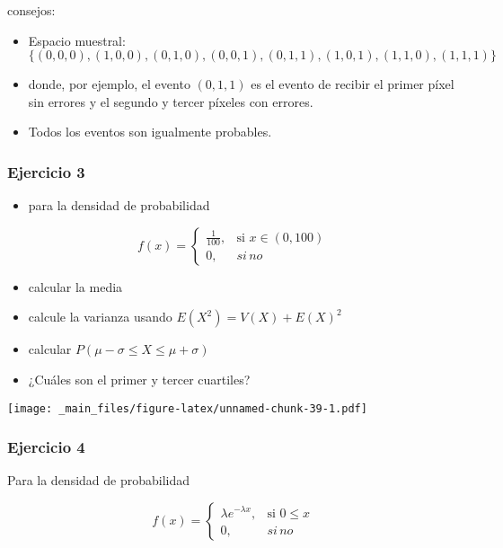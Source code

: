\documentclass[
]{book}
\providecommand{\tightlist}{%
  \setlength{\itemsep}{0pt}\setlength{\parskip}{0pt}}
\begin{document}
consejos:

\begin{itemize}
\item
  Espacio muestral: \(\{(0,0,0), (1,0,0), (0,1,0), (0,0,1), (0,1,1), (1, 0,1), (1,1,0), (1,1,1)\}\)
\item
  donde, por ejemplo, el evento \((0,1,1)\) es el evento de recibir el primer píxel sin errores y el segundo y tercer píxeles con errores.
\item
  Todos los eventos son igualmente probables.
\end{itemize}

\hypertarget{ejercicio-3-1}{%
\subsubsection{Ejercicio 3}\label{ejercicio-3-1}}

\begin{itemize}
\tightlist
\item
  para la densidad de probabilidad
\end{itemize}

\[
    f(x)= 
\begin{cases}
    \frac{1}{100},& \text{si } x\in (0,100)\\
    0,& si \, no 
\end{cases}
\]

\begin{itemize}
\tightlist
\item
  calcular la media
\item
  calcule la varianza usando \(E(X^2)=V(X)+E(X)^2\)
\item
  calcular \(P(\mu-\sigma\leq X \leq \mu+\sigma)\)
\item
  ¿Cuáles son el primer y tercer cuartiles?
\end{itemize}

\texttt{[image: \_main\_files/figure-latex/unnamed-chunk-39-1.pdf]}

\hypertarget{ejercicio-4-1}{%
\subsubsection{Ejercicio 4}\label{ejercicio-4-1}}

Para la densidad de probabilidad

\[
    f(x)= 
\begin{cases}
    \lambda e^{-\lambda x},& \text{si } 0 \leq x\\
    0,& si \, no 
\end{cases}
\]
\end{document}
